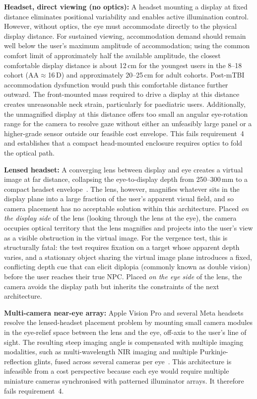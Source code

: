 \textbf{Headset, direct viewing (no optics):} A headset mounting a display at fixed distance eliminates positional variability and enables active illumination control. However, without optics, the eye must accommodate directly to the physical display distance. For sustained viewing, accommodation demand should remain well below the user's maximum amplitude of accommodation; using the common comfort limit of approximately half the available amplitude, the closest comfortable display distance is about 12\,cm for the youngest users in the 8--18 cohort (AA$\approx$16\,D) and approximately 20--25\,cm for adult cohorts. Post-mTBI accommodation dysfunction would push this comfortable distance further outward. The front-mounted mass required to drive a display at this distance creates unreasonable neck strain, particularly for paediatric users. Additionally, the unmagnified display at this distance offers too small an angular eye-rotation range for the camera to resolve gaze without either an unfeasibly large panel or a higher-grade sensor outside our feasible cost envelope. This fails requirement~4 and establishes that a compact head-mounted enclosure requires optics to fold the optical path.

\textbf{Lensed headset:} A converging lens between display and eye creates a virtual image at far distance, collapsing the eye-to-display depth from 250--300\,mm to a compact headset envelope~\cite{hecht2017optics}. The lens, however, magnifies whatever sits in the display plane into a large fraction of the user's apparent visual field, and so camera placement has no acceptable solution within this architecture. Placed \emph{on the display side} of the lens (looking through the lens at the eye), the camera occupies optical territory that the lens magnifies and projects into the user's view as a visible obstruction in the virtual image. For the vergence test, this is structurally fatal: the test requires fixation on a target whose apparent depth varies, and a stationary object sharing the virtual image plane introduces a fixed, conflicting depth cue that can elicit diplopia (commonly known as double vision) before the user reaches their true NPC. Placed \emph{on the eye side} of the lens, the camera avoids the display path but inherits the constraints of the next architecture.

\textbf{Multi-camera near-eye array:} Apple Vision Pro and several Meta headsets resolve the lensed-headset placement problem by mounting small camera modules in the eye-relief space between the lens and the eye, off-axis to the user's line of sight. The resulting steep imaging angle is compensated with multiple imaging modalities, such as multi-wavelength NIR imaging and multiple Purkinje-reflection glints, fused across several cameras per eye~\cite{berkner2021eyetracking}. This architecture is infeasible from a cost perspective because each eye would require multiple miniature cameras synchronised with patterned illuminator arrays. It therefore fails requirement~4.

